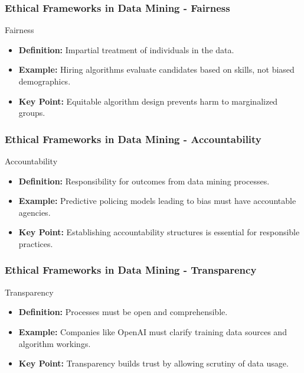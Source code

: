 \documentclass[aspectratio=169]{beamer}
\begin{document}
\begin{frame}[fragile]
    \frametitle{Ethical Frameworks in Data Mining - Fairness}
    \begin{block}{Fairness}
        \begin{itemize}
            \item \textbf{Definition:} Impartial treatment of individuals in the data.
            \item \textbf{Example:} Hiring algorithms evaluate candidates based on skills, not biased demographics.
            \item \textbf{Key Point:} Equitable algorithm design prevents harm to marginalized groups.
        \end{itemize}
    \end{block}
\end{frame}

\begin{frame}[fragile]
    \frametitle{Ethical Frameworks in Data Mining - Accountability}
    \begin{block}{Accountability}
        \begin{itemize}
            \item \textbf{Definition:} Responsibility for outcomes from data mining processes.
            \item \textbf{Example:} Predictive policing models leading to bias must have accountable agencies.
            \item \textbf{Key Point:} Establishing accountability structures is essential for responsible practices.
        \end{itemize}
    \end{block}
\end{frame}

\begin{frame}[fragile]
    \frametitle{Ethical Frameworks in Data Mining - Transparency}
    \begin{block}{Transparency}
        \begin{itemize}
            \item \textbf{Definition:} Processes must be open and comprehensible.
            \item \textbf{Example:} Companies like OpenAI must clarify training data sources and algorithm workings.
            \item \textbf{Key Point:} Transparency builds trust by allowing scrutiny of data usage.
        \end{itemize}
    \end{block}
\end{frame}
\end{document}
